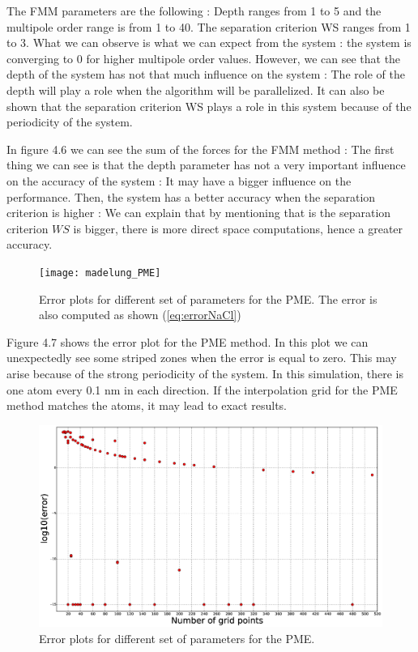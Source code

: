 \documentclass[11pt,twoside,a4paper]{report}
\begin{document}
	The FMM parameters are the following : Depth ranges from 1 to 5 and the multipole order range is from 1 to 40. The separation criterion WS ranges from 1 to 3.
	What we can observe is what we can expect from the system : the system is converging to $0$ for higher multipole order values. However, we can see that the depth of the system has not that much influence on the system : The role of the depth will play a role when the algorithm will be parallelized. It can also be shown that the separation criterion WS plays a role in this system because of the periodicity of the system.
	
	
	In figure 4.6 we can see the sum of the forces for the FMM method : The first thing we can see is that the depth parameter has not a very important influence on the accuracy of the system : It may have a bigger influence on the performance. Then, the system has a better accuracy when the separation criterion is higher : We can explain that by mentioning that is the separation criterion $WS$ is bigger, there is more direct space computations, hence a greater accuracy.

	\begin{figure}[H]
	   \texttt{[image: madelung\_PME]}
	    \centering 
    \caption{Error plots for different set of parameters for the PME.  The error is also computed as shown (\ref{eq:errorNaCl})}    
   \end{figure}  	
	
	Figure 4.7 shows the error plot for the PME method.	In this plot we can unexpectedly see some striped zones when the error is equal to zero. This may arise because of the strong periodicity of the system. In this simulation, there is one atom every 0.1 nm in each direction. If the interpolation grid for the PME method matches the atoms, it may lead to exact results.
		
	\begin{figure}[H]
	   \includegraphics[scale=0.3]{gridPoints}
	    \centering 
    \caption{Error plots for different set of parameters for the PME.}    
		\label{fig:grid}   
   \end{figure}  
   
\end{document}
